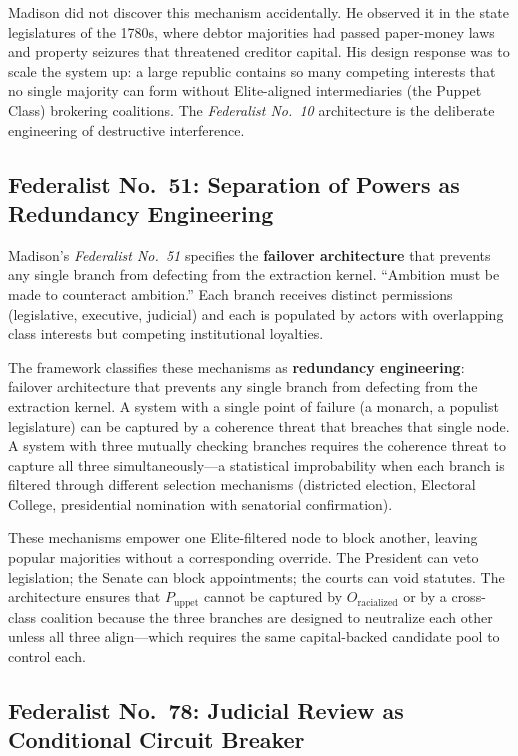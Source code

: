 Madison did not discover this mechanism accidentally. He observed it in the state legislatures of the 1780s, where debtor majorities had passed paper-money laws and property seizures that threatened creditor capital. His design response was to scale the system up: a large republic contains so many competing interests that no single majority can form without Elite-aligned intermediaries (the Puppet Class) brokering coalitions. The \textit{Federalist No.~10} architecture is the deliberate engineering of destructive interference.

\subsection{Federalist No.~51: Separation of Powers as Redundancy Engineering}

Madison's \textit{Federalist No.~51} specifies the \textbf{failover architecture} that prevents any single branch from defecting from the extraction kernel. ``Ambition must be made to counteract ambition.'' Each branch receives distinct permissions (legislative, executive, judicial) and each is populated by actors with overlapping class interests but competing institutional loyalties.

The framework classifies these mechanisms as \textbf{redundancy engineering}: failover architecture that prevents any single branch from defecting from the extraction kernel. A system with a single point of failure (a monarch, a populist legislature) can be captured by a coherence threat that breaches that single node. A system with three mutually checking branches requires the coherence threat to capture all three simultaneously---a statistical improbability when each branch is filtered through different selection mechanisms (districted election, Electoral College, presidential nomination with senatorial confirmation).

These mechanisms empower one Elite-filtered node to block another, leaving popular majorities without a corresponding override. The President can veto legislation; the Senate can block appointments; the courts can void statutes. The architecture ensures that $P_{\text{uppet}}$ cannot be captured by $O_{\text{racialized}}$ or by a cross-class coalition because the three branches are designed to neutralize each other unless all three align---which requires the same capital-backed candidate pool to control each.

\subsection{Federalist No.~78: Judicial Review as Conditional Circuit Breaker}

